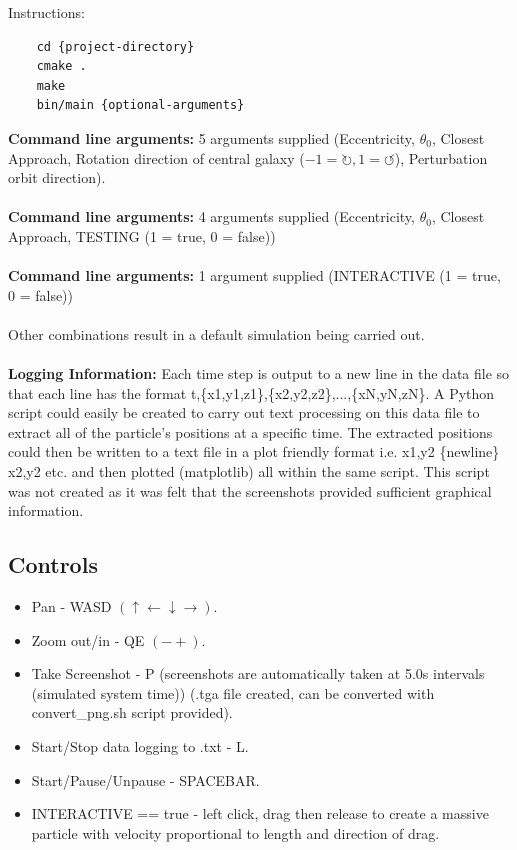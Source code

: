 \documentclass[10pt,a4paper]{article}
\begin{document}
Instructions:

\begin{lstlisting}
	cd {project-directory}
	cmake .
	make
	bin/main {optional-arguments}
\end{lstlisting}
\textbf{Command line arguments:} 5 arguments supplied (Eccentricity, $\theta_0$, Closest Approach, Rotation direction of central galaxy ($-1=\circlearrowright, 1=\circlearrowleft$), Perturbation orbit direction).
\\
\\
\textbf{Command line arguments:} 4 arguments supplied (Eccentricity, $\theta_0$, Closest Approach, TESTING (1 = true, 0 = false))
\\
\\
\textbf{Command line arguments:} 1 argument supplied (INTERACTIVE (1 = true, 0 = false))
\\
\\
Other combinations result in a default simulation being carried out.
\\
\\
\textbf{Logging Information:} Each time step is output to a new line in the data file so that each line has the format t,\{x1,y1,z1\},\{x2,y2,z2\},...,\{xN,yN,zN\}. A Python script could easily be created to carry out text processing on this data file to extract all of the particle's positions at a specific time. The extracted positions could then be written to a text file in a plot friendly format i.e. x1,y2 \{newline\} x2,y2 etc. and then plotted (matplotlib) all within the same script. This script was not created as it was felt that the screenshots provided sufficient graphical information.

\subsection{Controls}
\begin{itemize}
\item Pan - WASD $(\uparrow \leftarrow \downarrow \rightarrow)$.
\item Zoom out/in - QE $(-+)$.
\item Take Screenshot - P (screenshots are automatically taken at 5.0s intervals (simulated system time)) (.tga file created, can be converted with convert\_png.sh script provided).
\item Start/Stop data logging to .txt - L.
\item Start/Pause/Unpause - SPACEBAR.
\item INTERACTIVE == true - left click, drag then release to create a massive particle with velocity proportional to length and direction of drag.
\end{itemize}
\end{document}
